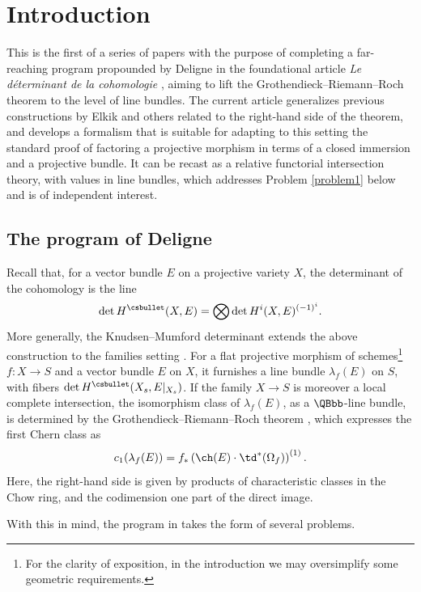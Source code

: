 \section{Introduction}
This is the first of a series of papers with the purpose of completing a far-reaching program propounded by Deligne in the foundational article \emph{Le déterminant de la cohomologie} \cite{Deligne-determinant}, aiming to lift the Grothendieck--Riemann--Roch theorem to the level of line bundles. The current article generalizes previous constructions by Elkik \cite{Elkikfib} and others related to the right-hand side of the theorem, and develops a formalism that is suitable for adapting to this setting the standard proof of factoring a projective morphism in terms of a closed immersion and a projective bundle. It can be recast as a relative functorial intersection theory, with values in line bundles, which addresses Problem \ref{problem1} below and is of independent interest.

\subsection{The program of Deligne}
Recall that, for a vector bundle $E$ on a projective variety $X$, the determinant of the cohomology is the line
\begin{displaymath}
\det H^{\csbullet}(X,E) = \bigotimes \det H^i(X,E)^{(-1)^i}.
\end{displaymath}
More generally, the Knudsen--Mumford determinant extends the above construction to the families setting \cite{KnudsenMumford}. For a flat projective morphism of schemes\footnote{For the clarity of exposition, in the introduction we may oversimplify some geometric requirements.} $f\colon X\to S$ and a vector bundle $E$ on $X$, it furnishes a line bundle $\lambda_{f}(E)$ on $S$, with fibers $\det H^{\csbullet}(X_{s},E|_{X_{s}})$. If the family $X\to S$ is moreover a local complete intersection, the isomorphism class of $\lambda_{f}(E)$, as a $\QBbb$-line bundle, is determined by the Grothendieck--Riemann--Roch theorem \cite{SGA6}, which expresses the first Chern class as
\begin{equation}\label{eq:GRR}
c_1(\lambda_{f}(E)) = f_\ast \left(\ch(E) \cdot \td^{\ast}(\Omega_f) \right)^{(1)}.
\end{equation}
Here, the right-hand side is given by products of characteristic classes in the Chow ring, and the codimension one part of the direct image.

With this in mind, the program in \cite{Deligne-determinant} takes the form of several problems.

